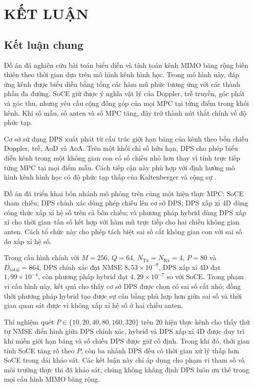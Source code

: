 \section*{\centering KẾT LUẬN}

\subsection*{Kết luận chung}

Đồ án đã nghiên cứu bài toán biểu diễn và tính toán kênh MIMO băng rộng biến thiên theo thời gian dựa trên mô hình kênh hình học. Trong mô hình này, đáp ứng kênh được biểu diễn bằng tổng các hàm mũ phức tương ứng với các thành phần đa đường. SoCE giữ được ý nghĩa vật lý của Doppler, trễ truyền, góc phát và góc thu, nhưng yêu cầu cộng đóng góp của mọi MPC tại từng điểm trong khối kênh. Khi số mẫu, số anten và số MPC tăng, đây trở thành nút thắt chính về độ phức tạp.

Cơ sở sử dụng DPS xuất phát từ cấu trúc giới hạn băng của kênh theo bốn chiều Doppler, trễ, AoD và AoA. Trên một khối chỉ số hữu hạn, DPS cho phép biểu diễn kênh trong một không gian con có số chiều nhỏ hơn thay vì tính trực tiếp từng MPC tại mọi điểm mẫu. Cách tiếp cận này phù hợp với định hướng mô hình kênh hình học có độ phức tạp thấp của Kaltenberger và cộng sự \cite{Kaltenberger2007}.

Đồ án đã triển khai bốn nhánh mô phỏng trên cùng một hiện thực MPC: SoCE tham chiếu; DPS chính xác dùng phép chiếu lên cơ sở DPS; DPS xấp xỉ 4D dùng công thức xấp xỉ hệ số trên cả bốn chiều; và phương pháp hybrid dùng DPS xấp xỉ cho thời gian--tần số kết hợp với hàm mũ trực tiếp cho hai chiều không gian anten. Cách tổ chức này cho phép tách biệt sai số cắt không gian con với sai số do xấp xỉ hệ số.

Trong cấu hình chính với \(M=256\), \(Q=64\), \(N_{\mathrm{Tx}}=N_{\mathrm{Rx}}=4\), \(P=80\) và \(D_{\mathrm{total}}=864\), DPS chính xác đạt NMSE \(8{,}53\times10^{-9}\), DPS xấp xỉ 4D đạt \(1{,}99\times10^{-4}\), còn phương pháp hybrid đạt \(4{,}29\times10^{-7}\) so với SoCE. Trong phạm vi cấu hình này, kết quả cho thấy cơ sở DPS được chọn có sai số cắt nhỏ; đồng thời phương pháp hybrid tạo được sự cân bằng phù hợp hơn giữa sai số và thời gian quan sát được vì không xấp xỉ hệ số ở hai chiều anten.

Thí nghiệm quét \(P\in\{10,20,40,80,160,320\}\) trên 20 hiện thực kênh cho thấy thứ tự NMSE điển hình giữa DPS chính xác, hybrid và DPS xấp xỉ 4D được duy trì khi miền giới hạn băng và số chiều DPS được giữ cố định. Trong khi đó, thời gian tính SoCE tăng rõ theo \(P\), còn ba nhánh DPS đều có thời gian xử lý thấp hơn SoCE trong dải khảo sát. Các kết luận này chỉ áp dụng cho phạm vi tham số và môi trường thực thi đã khảo sát; chúng không khẳng định DPS luôn ưu thế trong mọi cấu hình MIMO băng rộng.

